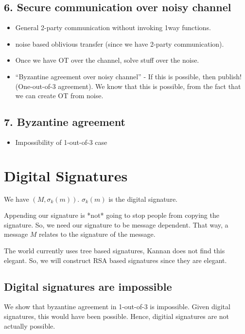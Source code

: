 \documentclass[11pt]{article}
\begin{document}
\begin{Itemize}
\begin{Itemize}
\subsection{6. Secure communication over noisy channel}
\begin{itemize}
\item General 2-party communication without invoking 1way functions.
\item noise based oblivious transfer (since we have 2-party communication).
\end{itemize}

\begin{itemize}
  \item Once we have OT over the channel, solve stuff over the noise.
  \item ``Byzantine agreement over noisy channel'' - If this is possible, then publish! (One-out-of-3 agreement).
        We know that this is possible, from the fact that we can create OT from noise.
\end{itemize}

\subsection{7. Byzantine agreement}
\begin{itemize}
\item Impossibility of 1-out-of-3 case
\end{itemize}


\section{Digital Signatures}

We have $(M, \sigma_k(m))$. $\sigma_k(m)$ is the digital signature.

Appending our signature is *not* going to stop people from copying the signature. So, we need our signature to be
message dependent. That way, a message $M$ relates to the signature of the message.

The world currently uses tree based signatures, Kannan does not find this elegant. So, we will construct RSA
based signatures since they are elegant.

\subsection{Digital signatures are impossible}
We show that byzantine agreement in 1-out-of-3 is impossible. Given digital signatures, this would have been possible.
Hence, digitial signatures are not actually possible.




\end{Itemize}
\end{Itemize}
\end{document}
